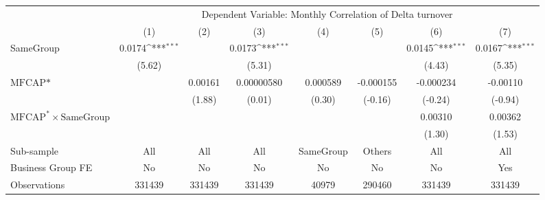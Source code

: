 {
\def\sym#1{\ifmmode^{#1}\else\(^{#1}\)\fi}
\begin{tabular}{l*{7}{c}}
\hline\hline
                    &\multicolumn{7}{c}{Dependent Variable:  Monthly Correlation of Delta turnover}                                                                           \\\cmidrule(lr){2-8}
                    &\multicolumn{1}{c}{(1)}         &\multicolumn{1}{c}{(2)}         &\multicolumn{1}{c}{(3)}         &\multicolumn{1}{c}{(4)}         &\multicolumn{1}{c}{(5)}         &\multicolumn{1}{c}{(6)}         &\multicolumn{1}{c}{(7)}         \\
\hline
SameGroup           &      0.0174\sym{***}&                     &      0.0173\sym{***}&                     &                     &      0.0145\sym{***}&      0.0167\sym{***}\\
                    &      (5.62)         &                     &      (5.31)         &                     &                     &      (4.43)         &      (5.35)         \\
[1em]
$ \text{MFCAP*} $   &                     &     0.00161         &  0.00000580         &    0.000589         &   -0.000155         &   -0.000234         &    -0.00110         \\
                    &                     &      (1.88)         &      (0.01)         &      (0.30)         &     (-0.16)         &     (-0.24)         &     (-0.94)         \\
[1em]
 $ \text{MFCAP}^* \times {\text{SameGroup} }  $ &                     &                     &                     &                     &                     &     0.00310         &     0.00362         \\
                    &                     &                     &                     &                     &                     &      (1.30)         &      (1.53)         \\
\hline
Sub-sample          &         All         &         All         &         All         &   SameGroup         &      Others         &         All         &         All         \\
Business Group FE   &          No         &          No         &          No         &          No         &          No         &          No         &         Yes         \\
Observations        &      331439         &      331439         &      331439         &       40979         &      290460         &      331439         &      331439         \\
\hline\hline  \end{tabular}}
